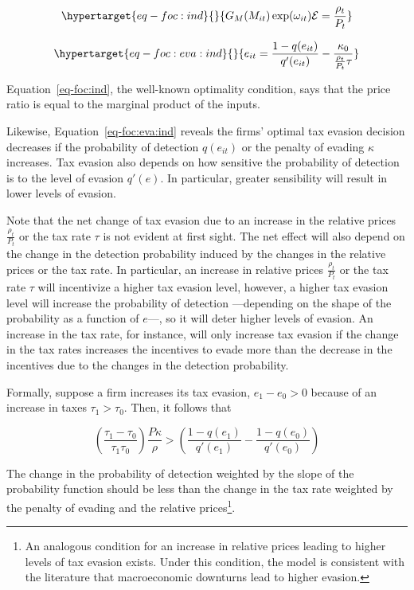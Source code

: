 \documentclass[
  12pt]{article}
\begin{document}
\begin{equation}\protect\hypertarget{eq-foc:ind}{}{
G_M(M_{it})\exp(\omega_{it})\mathcal{E}=\frac{\rho_{t}}{P_t}
}\label{eq-foc:ind}\end{equation}

\begin{equation}\protect\hypertarget{eq-foc:eva:ind}{}{
e_{it}=\frac{1-q(e_{it})}{q'(e_{it})}-\frac{\kappa_0}{\frac{\rho_{t}}{P_t}\tau}
}\label{eq-foc:eva:ind}\end{equation}

Equation~\ref{eq-foc:ind}, the well-known optimality condition, says
that the price ratio is equal to the marginal product of the inputs.

Likewise, Equation~\ref{eq-foc:eva:ind} reveals the firms' optimal tax
evasion decision decreases if the probability of detection \(q(e_{it})\)
or the penalty of evading \(\kappa\) increases. Tax evasion also depends
on how sensitive the probability of detection is to the level of evasion
\(q'(e)\). In particular, greater sensibility will result in lower
levels of evasion.

Note that the net change of tax evasion due to an increase in the
relative prices \(\frac{\rho_{t}}{P_t}\) or the tax rate \(\tau\) is not
evident at first sight. The net effect will also depend on the change in
the detection probability induced by the changes in the relative prices
or the tax rate. In particular, an increase in relative prices
\(\frac{\rho_{t}}{P_t}\) or the tax rate \(\tau\) will incentivize a
higher tax evasion level, however, a higher tax evasion level will
increase the probability of detection ---depending on the shape of the
probability as a function of \(e\)---, so it will deter higher levels of
evasion. An increase in the tax rate, for instance, will only increase
tax evasion if the change in the tax rates increases the incentives to
evade more than the decrease in the incentives due to the changes in the
detection probability.

Formally, suppose a firm increases its tax evasion, \(e_1-e_0>0\)
because of an increase in taxes \(\tau_1>\tau_0\). Then, it follows that

\[
\left(\frac{\tau_1-\tau_0}{\tau_1\tau_0}\right)\frac{P\kappa}{\rho}>
  \left(\frac{1-q(e_1)}{q'(e_1)}-\frac{1-q(e_0)}{q'(e_0)}\right)
\]

The change in the probability of detection weighted by the slope of the
probability function should be less than the change in the tax rate
weighted by the penalty of evading and the relative prices\footnote{An
  analogous condition for an increase in relative prices leading to
  higher levels of tax evasion exists. Under this condition, the model
  is consistent with the literature that macroeconomic downturns lead to
  higher evasion.}.
\end{document}

